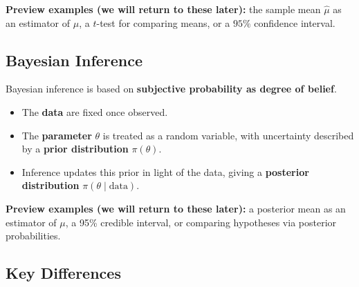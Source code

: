 \documentclass[
  letterpaper,
  DIV=11,
  numbers=noendperiod]{scrreprt}
\providecommand{\tightlist}{%
  \setlength{\itemsep}{0pt}\setlength{\parskip}{0pt}}
\theoremstyle{definition}
\theoremstyle{plain}
\theoremstyle{definition}
\theoremstyle{remark}
\begin{document}
\textbf{Preview examples (we will return to these later):} the sample
mean \(\hat{\mu}\) as an estimator of \(\mu\), a \(t\)-test for
comparing means, or a \(95\%\) confidence interval.

\subsection{Bayesian Inference}\label{bayesian-inference}

Bayesian inference is based on \textbf{subjective probability as degree
of belief}.

\begin{itemize}
\tightlist
\item
  The \textbf{data} are fixed once observed.
\item
  The \textbf{parameter} \(\theta\) is treated as a random variable,
  with uncertainty described by a \textbf{prior distribution}
  \(\pi(\theta)\).
\item
  Inference updates this prior in light of the data, giving a
  \textbf{posterior distribution} \(\pi(\theta \mid \text{data})\).
\end{itemize}

\textbf{Preview examples (we will return to these later):} a posterior
mean as an estimator of \(\mu\), a 95\% credible interval, or comparing
hypotheses via posterior probabilities.

\subsection{Key Differences}\label{key-differences}
\end{document}
